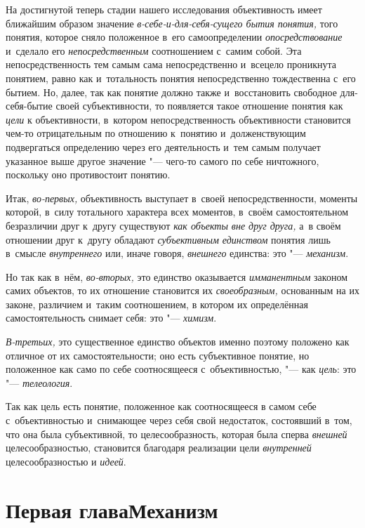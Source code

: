 На достигнутой теперь стадии нашего исследования объективность
имеет ближайшим образом значение {\em в-себе-и-для-себя-сущего бытия
понятия,} того понятия, которое сняло положенное в~его
самоопределении {\em опосредствование} и~сделало его {\em непосредственным}
соотношением с~самим собой. Эта непосредственность тем самым
сама непосредственно и~всецело проникнута понятием, равно как и~тотальность
понятия непосредственно тождественна с~его бытием. Но, далее, так как
понятие должно также и~восстановить свободное для-себя-бытие своей
субъективности, то появляется такое отношение понятия как {\em цели} к
объективности, в~котором непосредственность объективности становится чем-то
отрицательным по отношению к~понятию и~долженствующим подвергаться
определению через его деятельность и~тем самым получает указанное выше
другое значение "--- чего-то самого по себе ничтожного,
поскольку оно противостоит понятию.

Итак, {\em во-первых,} объективность выступает в~своей непосредственности,
моменты которой, в~силу тотального характера всех моментов, в~своём
самостоятельном безразличии друг к~другу существуют {\em как объекты вне друг
друга,} а~в своём отношении друг к~другу обладают {\em субъективным единством}
понятия лишь в~смысле {\em внутреннего} или, иначе говоря, {\em внешнего}
единства: это "--- {\em механизм}.

Но так как в~нём, {\em во-вторых,} это единство оказывается {\em имманентным}
законом самих объектов, то их отношение становится их {\em своеобразным,}
основанным на их законе, различием и~таким соотношением, в
котором их определённая самостоятельность снимает себя: это "--- {\em химизм}.

{\em В-третьих,} это
существенное единство объектов именно поэтому положено как отличное от их
самостоятельности; оно есть субъективное понятие, но положенное как само по
себе соотносящееся с~объективностью, "--- как
{\em цель}: это "--- {\em телеология}.

Так как цель есть понятие, положенное как соотносящееся в
самом себе с~объективностью и~снимающее через себя свой недостаток,
состоявший в~том, что она была субъективной, то целесообразность, которая
была сперва {\em внешней} целесообразностью, становится благодаря реализации
цели {\em внутренней} целесообразностью и {\em идеей}.

\chapter[Первая глава Механизм]{Первая глава\newline Механизм}

